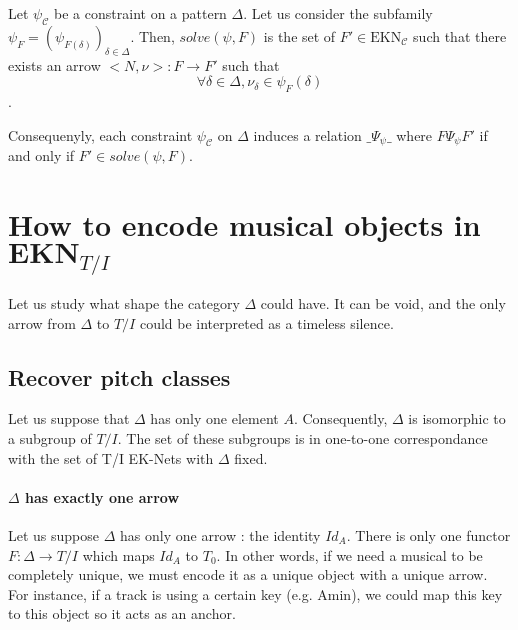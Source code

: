 \begin{defn}
    Let $\psi_\mathcal{C}$ be a constraint on a pattern $\Delta$.
    Let us consider the subfamily $\psi_F = (\psi_{F(\delta)})_{\delta\in\Delta}$. Then, $solve(\psi,F)$ is the set of $F' \in \text{EKN}_\mathcal{C}$ such that there exists an arrow $\big< N, \nu\big> : F \rightarrow F'$ such that
    $$\forall \delta \in \Delta, \nu_\delta \in \psi_F(\delta)$$.
\end{defn}

Consequenyly, each constraint $\psi_\mathcal{C}$ on $\Delta$ induces a relation
$\_\Psi_\psi \_$ where $F\Psi_\psi F'$ if and only if $F'\in solve(\psi,F)$.



\section{How to encode musical objects in $\textbf{EKN}_{T/I}$}

Let us study what shape the category $\Delta$ could have. It can be void, and the only arrow from $\Delta$ to $T/I$ could be interpreted as a timeless silence.

\subsection{Recover pitch classes}
Let us suppose that $\Delta$ has only one element $A$. Consequently, $\Delta$ is isomorphic to a subgroup of $T/I$. The set of these subgroups is in one-to-one correspondance with the set of T/I EK-Nets with $\Delta$ fixed.

\paragraph{$\Delta$ has exactly one arrow}
Let us suppose $\Delta$ has only one arrow : the identity $Id_A$. There is only one functor $F:\Delta \rightarrow T/I$ which maps $Id_A$ to $T_0$. In other words, if we need a musical to be completely unique, we must encode it as a unique object with a unique arrow. For instance, if a track is using a certain key (e.g. Amin), we could map this key to this object so it acts as an anchor.



